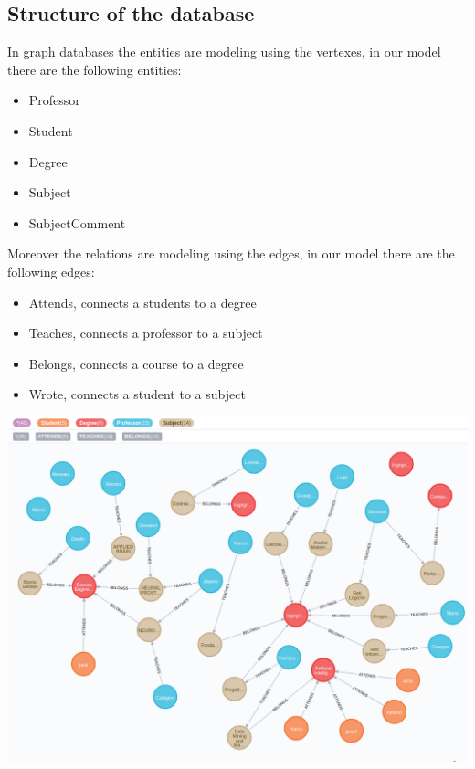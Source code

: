 \documentclass[a4paper]{article}
\begin{document}
\subsection{Structure of the database}
In graph databases the entities are modeling using the vertexes, in our model there are the following entities:
\begin{itemize}
\item Professor
\item Student
\item Degree
\item Subject
\item SubjectComment
\end{itemize}
Moreover the relations are modeling using the edges, in our model there are the following edges:
\begin{itemize}
\item Attends, connects a students to a degree
\item Teaches, connects a professor to a subject
\item Belongs, connects a course to a degree
\item Wrote, connects a student to a subject
\end{itemize}


\begin{minipage}{\linewidth}
\begin{center}
\vspace{4mm}
\includegraphics[width = 1\textwidth]{./images/diagrams/graphDb.png} 
\vspace{2mm}
\label{fig:analisys_diagram}
\end{center}
\end{minipage}
\clearpage
\end{document}
